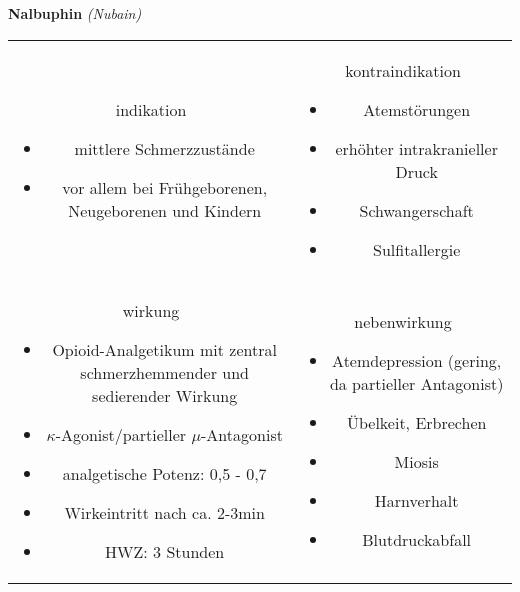 \begin{frame}{
    \textbf{Nalbuphin}
    \textit{(Nubain)}
}
    \begin{tabular}{c c}
        \begin{beamercolorbox}[wd=\boxwidth\textwidth,ht=\boxheight\textheight,sep=1em]{indikation}
            \begin{itemize}
                \item mittlere Schmerzzustände
                \item vor allem bei Frühgeborenen, Neugeborenen und Kindern
            \end{itemize}
        \end{beamercolorbox} & 
        \begin{beamercolorbox}[wd=\boxwidth\textwidth,ht=\boxheight\textheight,sep=1em]{kontraindikation}
            \begin{itemize}
                \item Atemstörungen
                \item erhöhter intrakranieller Druck
                \item Schwangerschaft
                \item Sulfitallergie
            \end{itemize}
        \end{beamercolorbox} \\
        \begin{beamercolorbox}[wd=\boxwidth\textwidth,ht=\boxheight\textheight,sep=1em]{wirkung}
            \begin{itemize}
                \item Opioid-Analgetikum mit zentral schmerzhemmender und sedierender Wirkung
                \item $\kappa$-Agonist/partieller $\mu$-Antagonist
                \item analgetische Potenz: 0,5 - 0,7
                \item Wirkeintritt nach ca. 2-3min
                \item HWZ: 3 Stunden
            \end{itemize}
        \end{beamercolorbox} & 
        \begin{beamercolorbox}[wd=\boxwidth\textwidth,ht=\boxheight\textheight,sep=1em]{nebenwirkung}
            \begin{itemize}
                \item Atemdepression (gering, da partieller Antagonist)
                \item Übelkeit, Erbrechen
                \item Miosis
                \item Harnverhalt
                \item Blutdruckabfall
            \end{itemize}
        \end{beamercolorbox} \\
    \end{tabular}
\end{frame}

